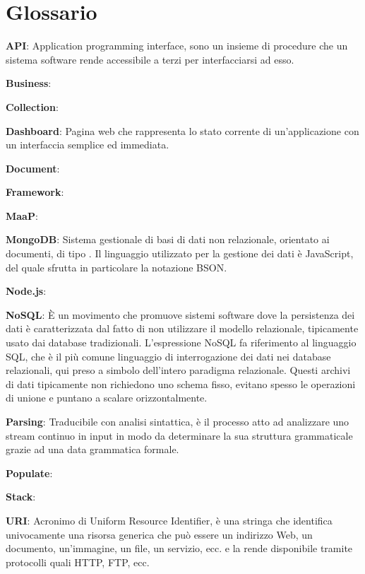 \section{Glossario}

\textbf{API}: Application programming interface, sono un insieme di procedure che un sistema software rende accessibile a terzi per interfacciarsi ad esso.

\textbf{Business}: 

\textbf{Collection}: %

\textbf{Dashboard}: Pagina web che rappresenta lo stato corrente di un'applicazione con un interfaccia semplice ed immediata.

\textbf{Document}: %

\textbf{Framework}: %

\textbf{MaaP}: %

\textbf{MongoDB}: Sistema gestionale di basi di dati non relazionale, orientato ai documenti, di tipo . Il linguaggio utilizzato per la gestione dei dati è JavaScript, del quale sfrutta in particolare la notazione BSON.

\textbf{Node.js}: %

\textbf{NoSQL}: È un movimento che promuove sistemi software dove la persistenza dei dati è caratterizzata dal fatto di non utilizzare il modello relazionale, tipicamente usato dai database tradizionali. L'espressione NoSQL fa riferimento al linguaggio SQL, che è il più comune linguaggio di interrogazione dei dati nei database relazionali, qui preso a simbolo dell'intero paradigma relazionale. Questi archivi di dati tipicamente non richiedono uno schema fisso, evitano spesso le operazioni di unione e puntano a scalare orizzontalmente.

\textbf{Parsing}: Traducibile con analisi sintattica, è il processo atto ad analizzare uno stream continuo in input in modo da determinare la sua struttura grammaticale grazie ad una data grammatica formale.

\textbf{Populate}: %

\textbf{Stack}: %

\textbf{URI}: Acronimo di Uniform Resource Identifier, è una stringa che identifica univocamente una risorsa generica che può essere un indirizzo Web, un documento, un'immagine, un file, un servizio, ecc. e la rende disponibile tramite protocolli quali HTTP, FTP, ecc.